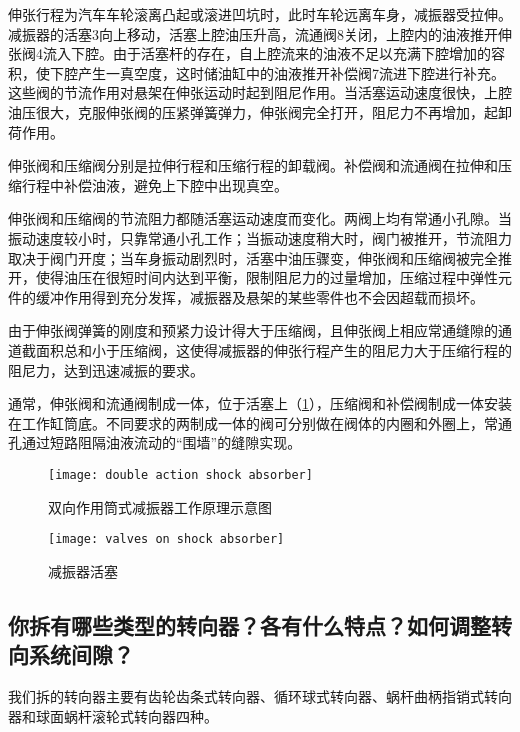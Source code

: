 \documentclass[UTF8]{ctexart}
\numberwithin{figure}{section}
\numberwithin{table}{section}
\begin{document}
伸张行程为汽车车轮滚离凸起或滚进凹坑时，此时车轮远离车身，减振器受拉伸。减振器的活塞3向上移动，活塞上腔油压升高，流通阀8关闭，上腔内的油液推开伸张阀4流入下腔。由于活塞杆的存在，自上腔流来的油液不足以充满下腔增加的容积，使下腔产生一真空度，这时储油缸中的油液推开补偿阀7流进下腔进行补充。这些阀的节流作用对悬架在伸张运动时起到阻尼作用。当活塞运动速度很快，上腔油压很大，克服伸张阀的压紧弹簧弹力，伸张阀完全打开，阻尼力不再增加，起卸荷作用。

伸张阀和压缩阀分别是拉伸行程和压缩行程的卸载阀。补偿阀和流通阀在拉伸和压缩行程中补偿油液，避免上下腔中出现真空。

伸张阀和压缩阀的节流阻力都随活塞运动速度而变化。两阀上均有常通小孔隙。当振动速度较小时，只靠常通小孔工作；当振动速度稍大时，阀门被推开，节流阻力取决于阀门开度；当车身振动剧烈时，活塞中油压骤变，伸张阀和压缩阀被完全推开，使得油压在很短时间内达到平衡，限制阻尼力的过量增加，压缩过程中弹性元件的缓冲作用得到充分发挥，减振器及悬架的某些零件也不会因超载而损坏。

由于伸张阀弹簧的刚度和预紧力设计得大于压缩阀，且伸张阀上相应常通缝隙的通道截面积总和小于压缩阀，这使得减振器的伸张行程产生的阻尼力大于压缩行程的阻尼力，达到迅速减振的要求。

通常，伸张阀和流通阀制成一体，位于活塞上（\cref{valves on shock absorber}），压缩阀和补偿阀制成一体安装在工作缸筒底。不同要求的两制成一体的阀可分别做在阀体的内圈和外圈上，常通孔通过短路阻隔油液流动的“围墙”的缝隙实现。

\begin{figure}[htbp]
	\centering
	\begin{minipage}[b]{0.3\textwidth}
		\centering
		\texttt{[image: double action shock absorber]}
		\caption{双向作用筒式减振器工作原理示意图}
		\label{double action shock absorber}
	\end{minipage}
	\begin{minipage}[b]{0.6\textwidth}
		\centering
		\texttt{[image: valves on shock absorber]}
		\caption{减振器活塞}
		\label{valves on shock absorber}
	\end{minipage}
\end{figure}

\subsection{你拆有哪些类型的转向器？各有什么特点？如何调整转向系统间隙？}

我们拆的转向器主要有齿轮齿条式转向器、循环球式转向器、蜗杆曲柄指销式转向器和球面蜗杆滚轮式转向器四种。
\end{document}
